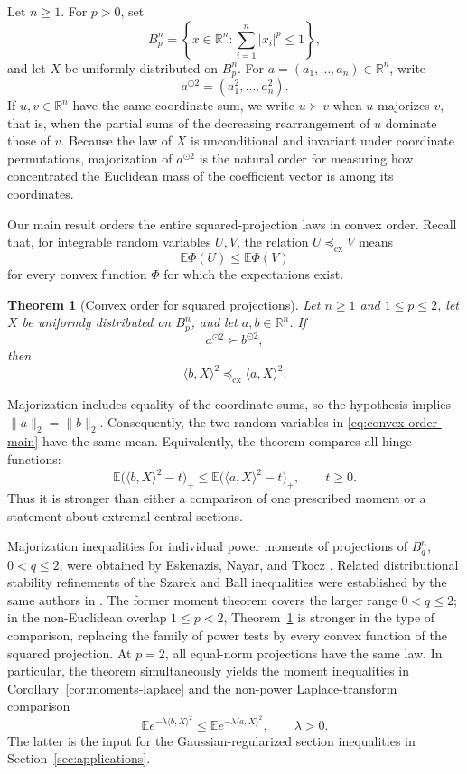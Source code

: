 \documentclass[pdflatex,sn-mathphys-num]{sn-jnl}
\numberwithin{equation}{section}
\theoremstyle{thmstyleone}
\newtheorem{theorem}{Theorem}[section]
\theoremstyle{thmstylethree}
\newcommand{\R}{\mathbb{R}}
\newcommand{\E}{\mathbb{E}}
\newcommand{\1}{\mathbf{1}}
\newcommand{\cx}{\preceq_{\mathrm{cx}}}
\newcommand{\sqvec}[1]{#1^{\odot 2}}
\begin{document}
Let $n\ge1$. For $p>0$, set
\[
 B_p^n=\left\{x\in\R^n:\sum_{i=1}^n |x_i|^p\le1\right\},
\]
and let $X$ be uniformly distributed on $B_p^n$. For
$a=(a_1,\ldots,a_n)\in\R^n$, write
\[
 \sqvec{a}=(a_1^2,\ldots,a_n^2).
\]
If $u,v\in\R^n$ have the same coordinate sum, we write $u\succ v$ when
$u$ majorizes $v$, that is, when the partial sums of the decreasing
rearrangement of $u$ dominate those of $v$. Because the law of $X$ is
unconditional and invariant under coordinate permutations, majorization
of $\sqvec a$ is the natural order for measuring how concentrated the
Euclidean mass of the coefficient vector is among its coordinates.

Our main result orders the entire squared-projection laws in convex
order. Recall that, for integrable random variables $U,V$, the relation
$U\cx V$ means
\[
 \E\Phi(U)\le\E\Phi(V)
\]
for every convex function $\Phi$ for which the expectations exist.

\begin{theorem}[Convex order for squared projections]\label{thm:convex-order-main}
Let $n\ge1$ and $1\le p\le2$, let $X$ be uniformly distributed on
$B_p^n$, and let $a,b\in\R^n$. If
\[
 \sqvec a\succ\sqvec b,
\]
then
\begin{equation}\label{eq:convex-order-main}
 \langle b,X\rangle^2\cx\langle a,X\rangle^2.
\end{equation}
\end{theorem}

Majorization includes equality of the coordinate sums, so the hypothesis
implies $\|a\|_2=\|b\|_2$. Consequently, the two random variables in
\eqref{eq:convex-order-main} have the same mean. Equivalently, the
theorem compares all hinge functions:
\[
 \E\bigl(\langle b,X\rangle^2-t\bigr)_+
 \le
 \E\bigl(\langle a,X\rangle^2-t\bigr)_+,
 \qquad t\ge0.
\]
Thus it is stronger than either a comparison of one prescribed moment or
a statement about extremal central sections.

Majorization inequalities for individual power moments of projections
of $B_q^n$, $0<q\le2$, were obtained by Eskenazis, Nayar, and Tkocz
\cite{EskenazisNayarTkocz}. Related distributional stability refinements
of the Szarek and Ball inequalities were established by the same authors
in \cite{EskenazisNayarTkoczStability}. The former moment theorem covers
the larger range $0<q\le2$; in the non-Euclidean overlap
$1\le p<2$, Theorem~\ref{thm:convex-order-main} is stronger in the
type of comparison, replacing the family of power tests by every convex
function of the squared projection. At $p=2$, all equal-norm projections
have the same law. In particular, the theorem simultaneously yields the
moment inequalities in Corollary~\ref{cor:moments-laplace} and the
non-power Laplace-transform comparison
\[
 \E e^{-\lambda\langle b,X\rangle^2}
 \le
 \E e^{-\lambda\langle a,X\rangle^2},
 \qquad \lambda>0.
\]
The latter is the input for the Gaussian-regularized section
inequalities in Section~\ref{sec:applications}.
\end{document}
